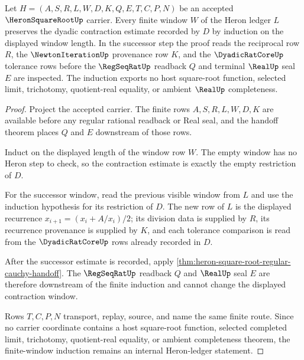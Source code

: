 \begin{theorem}
\label{thm:heron-square-root-finite-window-contraction-induction}
Let $H=(A,S,R,L,W,D,K,Q,E,T,C,P,N)$ be an accepted $\HeronSquareRootUp$ carrier. Every finite window $W$ of the Heron ledger $L$ preserves the dyadic contraction estimate recorded by $D$ by induction on the displayed window length. In the successor step the proof reads the reciprocal row $R$, the $\NewtonIterationUp$ provenance row $K$, and the $\DyadicRatCoreUp$ tolerance rows before the $\RegSeqRatUp$ readback $Q$ and terminal $\RealUp$ seal $E$ are inspected. The induction exports no host square-root function, selected limit, trichotomy, quotient-real equality, or ambient $\RealUp$ completeness.
\end{theorem}
\begin{proof}
Project the accepted carrier. The finite rows $A,S,R,L,W,D,K$ are available before any regular rational readback or Real seal, and the handoff theorem places $Q$ and $E$ downstream of those rows.

Induct on the displayed length of the window row $W$. The empty window has no Heron step to check, so the contraction estimate is exactly the empty restriction of $D$.

For the successor window, read the previous visible window from $L$ and use the induction hypothesis for its restriction of $D$. The new row of $L$ is the displayed recurrence $x_{i+1}=(x_i+A/x_i)/2$; its division data is supplied by $R$, its recurrence provenance is supplied by $K$, and each tolerance comparison is read from the $\DyadicRatCoreUp$ rows already recorded in $D$.

After the successor estimate is recorded, apply \autoref{thm:heron-square-root-regular-cauchy-handoff}. The $\RegSeqRatUp$ readback $Q$ and $\RealUp$ seal $E$ are therefore downstream of the finite induction and cannot change the displayed contraction window.

Rows $T,C,P,N$ transport, replay, source, and name the same finite route. Since no carrier coordinate contains a host square-root function, selected completed limit, trichotomy, quotient-real equality, or ambient completeness theorem, the finite-window induction remains an internal Heron-ledger statement.
\end{proof}

